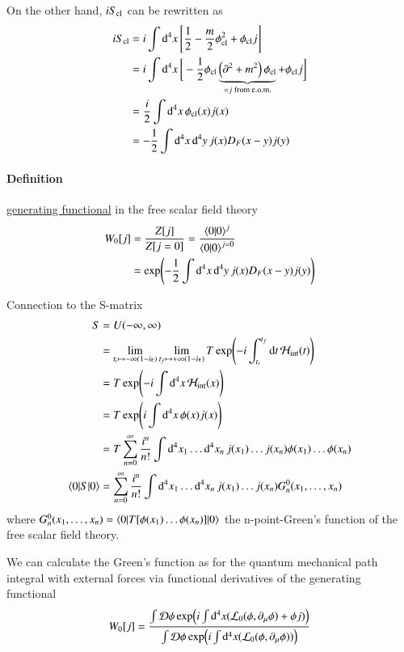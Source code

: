 On the other hand, $iS_{\text{cl}}$ can be rewritten as
\begin{align*}
   iS_{\text{cl}} &= i \int \dd[4]{x} \left[ \frac{1}{2} - \frac{m}{2} \phi_{\text{cl}}^2 + \phi_{\text{cl}} j \right] \\
           &= i \int \dd[4]{x} \bigg[ -\frac{1}{2} \phi_{\text{cl}} \underbrace{\left( \partial^2 + m^2 \right)\phi_{\text{cl}}}_{=j \;\text{from e.o.m.}} + \phi_{\text{cl}} j \bigg] \\
           &= \frac{i}{2} \int \dd[4]{x} \phi_{\text{cl}}(x) j(x) \\
           &= -\frac{1}{2} \int \dd[4]{x} \dd[4]{y} j(x) D_F(x-y) j(y)
\end{align*}

\paragraph{Definition} \underline{generating functional} in the free scalar field theory
\begin{align}
   W_0[j] &= \frac{Z[j]}{Z[j=0]} = \frac{\braket{0 | 0}^j}{\braket{0 | 0}^{j=0}} \notag\\
            &= \exp(-\frac{1}{2} \int \dd[4]{x}\dd[4]{y} j(x) D_F(x-y) j(y))
\end{align}

Connection to the S-matrix
\begin{align}
   S &= U(-\infty, \infty) \notag\\
     &= \lim_{t_i \mapsto -\infty(1-i\epsilon)}\lim_{t_f \mapsto +\infty(1-i\epsilon)} T \exp(-i\int^{t_f}_{t_i} \dd{t} \mathcal{H}_\text{int} (t)) \notag\\
   &= T \exp(-i\int \dd[4]{x}\mathcal{H}_\text{int} (x)) \notag\\
   &= T \exp(i\int \dd[4]{x} \phi(x) j(x)) \notag\\
   &= T \sum_{n=0}^{\infty} \frac{i^n}{n!} \int \dd[4]{x_1} \dots \dd[4]{x_n} j(x_1) \dots j(x_n) \phi(x_1) \dots \phi(x_n) \notag\\
   \braket{0 | S | 0} &= \sum_{n=0}^{\infty} \frac{i^n}{n!} \int \dd[4]{x_1} \dots \dd[4]{x_n}  j(x_1) \dots j(x_n)G_n^0 (x_1, \dots, x_n)
\end{align}
where $G^0_n(x_1, \dots, x_n) = \braket{0 | T [\phi(x_1) \dots \phi(x_n)]| 0}$ the n-point-Green's function of the free scalar field theory.

We can calculate the Green's function as for the quantum mechanical path integral with external forces via functional derivatives of the generating functional
\begin{align}
   W_0[j] = \frac{\int \mathcal{D} \phi \exp(i\int \dd^4 x (\mathcal{L}_0(\phi, \partial_\mu \phi)+\phi j))}{\int \mathcal{D} \phi \exp(i\int \dd^4 x (\mathcal{L}_0(\phi, \partial_\mu \phi)))}
\end{align}

